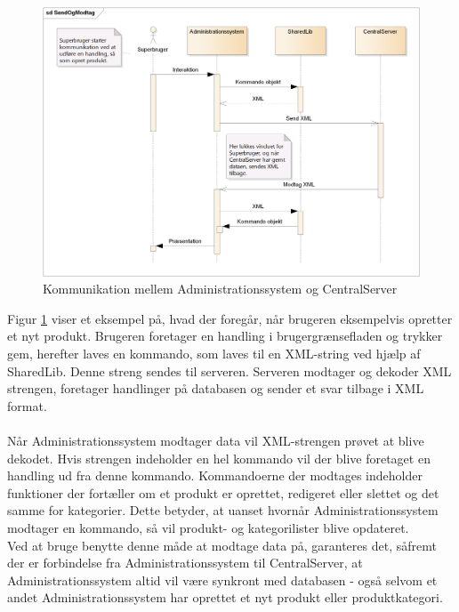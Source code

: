 \begin{figure}[H]
	\centering
	\includegraphics[width=1\textwidth]{Projektbeskrivelse/DesignOgImplementering/Images/Administrationssystem-sekvensdiagram}
	\caption{Kommunikation mellem Administrationssystem og CentralServer}
	\label{fig:adminsekvens}
\end{figure}

Figur \ref{fig:adminsekvens} viser et eksempel på, hvad der foregår, når brugeren eksempelvis opretter et nyt produkt. Brugeren foretager en handling i brugergrænsefladen og trykker gem, herefter laves en kommando, som laves til en XML-string ved hjælp af SharedLib. Denne streng sendes til serveren. Serveren modtager og dekoder XML strengen, foretager handlinger på databasen og sender et svar tilbage i XML format.\\\\
Når Administrationssystem modtager data vil XML-strengen prøvet at blive dekodet. Hvis strengen indeholder en hel kommando vil der blive foretaget en handling ud fra denne kommando. Kommandoerne der modtages indeholder funktioner der fortæller om et produkt er oprettet, redigeret eller slettet og det samme for kategorier. Dette betyder, at uanset hvornår Administrationssystem modtager en kommando, så vil produkt- og kategorilister blive opdateret.\\
Ved at bruge benytte denne måde at modtage data på, garanteres det, såfremt der er forbindelse fra Administrationssystem til CentralServer, at Administrationssystem altid vil være synkront med databasen - også selvom et andet Administrationssystem har oprettet et nyt produkt eller produktkategori.
